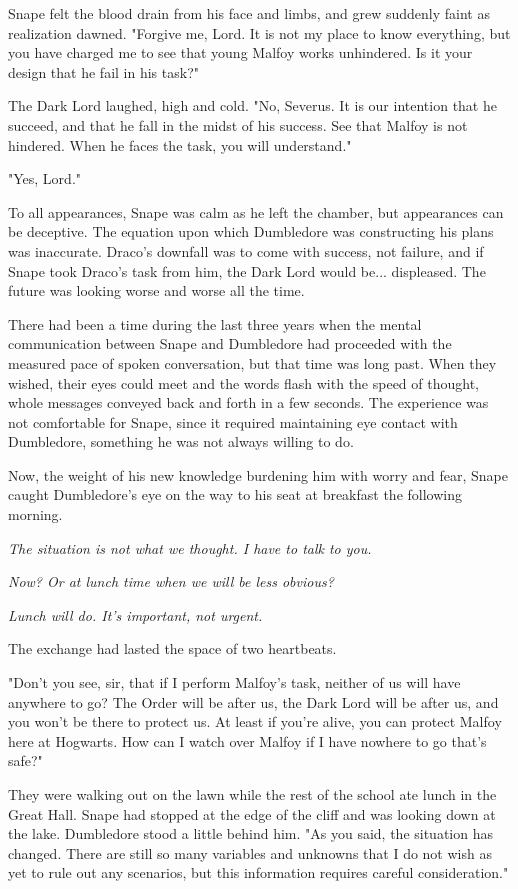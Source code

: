 Snape felt the blood drain from his face and limbs, and grew suddenly faint as realization dawned. "Forgive me, Lord. It is not my place to know everything, but you have charged me to see that young Malfoy works unhindered. Is it your design that he fail in his task?"

The Dark Lord laughed, high and cold. "No, Severus. It is our intention that he succeed, and that he fall in the midst of his success. See that Malfoy is not hindered. When he faces the task, you will understand."

"Yes, Lord."

To all appearances, Snape was calm as he left the chamber, but appearances can be deceptive. The equation upon which Dumbledore was constructing his plans was inaccurate. Draco's downfall was to come with success, not failure, and if Snape took Draco's task from him, the Dark Lord would be... displeased. The future was looking worse and worse all the time.

There had been a time during the last three years when the mental communication between Snape and Dumbledore had proceeded with the measured pace of spoken conversation, but that time was long past. When they wished, their eyes could meet and the words flash with the speed of thought, whole messages conveyed back and forth in a few seconds. The experience was not comfortable for Snape, since it required maintaining eye contact with Dumbledore, something he was not always willing to do.

Now, the weight of his new knowledge burdening him with worry and fear, Snape caught Dumbledore's eye on the way to his seat at breakfast the following morning.

\emph{The situation is not what we thought. I have to talk to you.}

\emph{Now? Or at lunch time when we will be less obvious?}

\emph{Lunch will do. It's important, not urgent.}

The exchange had lasted the space of two heartbeats.

\sbreak

"Don't you see, sir, that if I perform Malfoy's task, neither of us will have anywhere to go? The Order will be after us, the Dark Lord will be after us, and you won't be there to protect us. At least if you're alive, you can protect Malfoy here at Hogwarts. How can I watch over Malfoy if I have nowhere to go that's safe?"

They were walking out on the lawn while the rest of the school ate lunch in the Great Hall. Snape had stopped at the edge of the cliff and was looking down at the lake. Dumbledore stood a little behind him. "As you said, the situation has changed. There are still so many variables and unknowns that I do not wish as yet to rule out any scenarios, but this information requires careful consideration."

